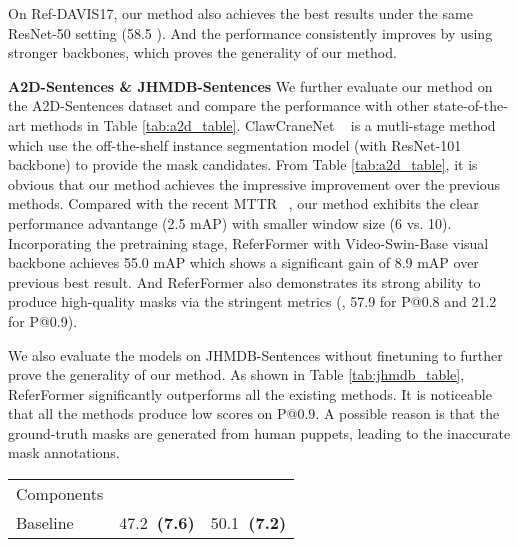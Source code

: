 \documentclass[10pt,twocolumn,letterpaper]{article}
\newcommand{\negacc}[1]{{\bf \fontsize{8.0}{42}\selectfont \color{myred}~(#1)}}
\newcommand{\myparagraph}[1]{{\vspace{.5em} \noindent \bf #1}}
\begin{document}
{On Ref-DAVIS17, our method also achieves the best results under the same ResNet-50 setting (58.5 ). And the performance consistently improves by using stronger backbones, which proves the generality of our method.

\vspace{-2mm}
\myparagraph{A2D-Sentences \& JHMDB-Sentences } 
We further evaluate our method on the A2D-Sentences dataset and compare the performance with other state-of-the-art methods in Table \ref{tab:a2d_table}. ClawCraneNet ~\cite{liang2021clawcranenet} is a mutli-stage method which use the off-the-shelf instance segmentation model (with ResNet-101 backbone) to provide the mask candidates. From Table \ref{tab:a2d_table}, it is obvious that our method achieves the impressive improvement over the previous methods. Compared with the recent MTTR ~\cite{botach2021mttr}, our method exhibits the clear performance advantange (2.5 mAP) with smaller window size (6 vs. 10). Incorporating the pretraining stage, ReferFormer with Video-Swin-Base visual backbone achieves 55.0 mAP which shows a significant gain of 8.9 mAP over previous best result. And ReferFormer also demonstrates its strong ability to produce high-quality masks via the stringent metrics (\eg, 57.9 for P@0.8 and 21.2 for P@0.9). 

We also evaluate the models on JHMDB-Sentences without finetuning to further prove the generality of our method. As shown in Table \ref{tab:jhmdb_table}, ReferFormer significantly outperforms all the existing methods. It is noticeable that all the methods produce low scores on P@0.9. A possible reason is that the ground-truth masks are generated from human puppets, leading to the inaccurate mask annotations.




\begin{table}[t]
    \begin{center}
        \begin{tabular}{l | l l }

\toprule

Components &  \multicolumn{1}{c}{} & \multicolumn{1}{c}{} \\

\arrayrulecolor{white}\hline
\arrayrulecolor{black}\hline
\arrayrulecolor{white}\hline

\arrayrulecolor{white}\hline
\arrayrulecolor{black}\hline
\arrayrulecolor{white}\hline

Baseline & 47.2\negacc{7.6} & 50.1\negacc{7.2} \\


\end{tabular}
\end{center}
\end{table}}
\end{document}
